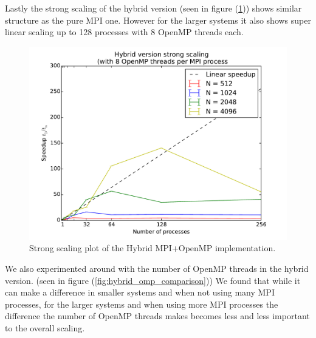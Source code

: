 \documentclass[11pt,a4paper]{article} %
\begin{document}
Lastly the strong scaling of the hybrid version (seen in figure (\ref{fig:hybrid_strong_scaling})) shows similar structure as the pure MPI one.
However for the larger systems it also shows super linear scaling up to 128 processes with 8 OpenMP threads each. \\

\begin{figure}
\includegraphics[width=\textwidth]{hybrid_strong_scaling.pdf}
\caption{Strong scaling plot of the Hybrid MPI+OpenMP implementation.}
\label{fig:hybrid_strong_scaling}
\end{figure}

We also experimented around with the number of OpenMP threads in the hybrid version. (seen in figure (\ref{fig:hybrid_omp_comparison}))
We found that while it can make a difference in smaller systems and when not using many MPI processes, for the larger systems and when using more MPI processes the difference the number of OpenMP threads makes becomes less and less important to the overall scaling. \\
\end{document}
